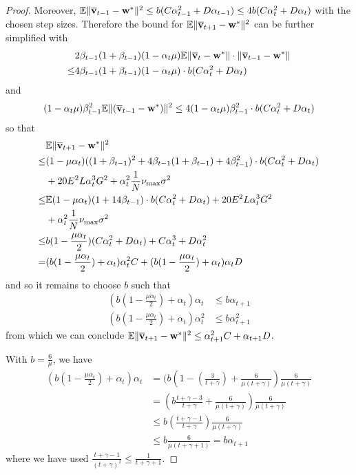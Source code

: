 \begin{proof}
Moreover, $\mathbb{E}\|{\overline{\mathbf{v}}}_{t-1}-{\mathbf{w}}^{\ast}\|^{2}\leq b(C\alpha_{t-1}^{2}+D\alpha_{t-1})\leq 4b(C\alpha_{t}^{2}+D\alpha_{t})$
with the chosen step sizes.
Therefore the bound for $\mathbb{E}\|{\overline{\mathbf{v}}}_{t+1}-{\mathbf{w}}^{\ast}\|^{2}$
can be further simplified with 
\begin{align*}
&2\beta_{t-1}(1+\beta_{t-1})(1-\alpha_{t}\mu)\mathbb{E}\|{\overline{\mathbf{v}}}_{t}-{\mathbf{w}}^{\ast}\|\cdot\|{\overline{\mathbf{v}}}_{t-1}-{\mathbf{w}}^{\ast}\| \\
\leq & 4\beta_{t-1}(1+\beta_{t-1})(1-\alpha_{t}\mu)\cdot b(C\alpha_{t}^{2}+D\alpha_{t})
\end{align*}
and 
\begin{align*}
(1-\alpha_{t}\mu)\beta_{t-1}^{2}\mathbb{E}\|({\overline{\mathbf{v}}}_{t-1}-{\mathbf{w}}^{\ast})\|^{2} 
\leq 4(1-\alpha_{t}\mu)\beta_{t-1}^{2}\cdot b(C\alpha_{t}^{2}+D\alpha_{t})
\end{align*}
so that
\begin{align*}
&\mathbb{E}\|{\overline{\mathbf{v}}}_{t+1}-{\mathbf{w}}^{\ast}\|^{2} \\
 \leq&(1-\mu\alpha_{t})((1+\beta_{t-1})^{2}+4\beta_{t-1}(1+\beta_{t-1})+4\beta_{t-1}^{2})\cdot b(C\alpha_{t}^{2}+D\alpha_{t})\\
& +20E^{2}L\alpha_{t}^{3}G^{2}+\alpha_{t}^{2}\frac{1}{N}\nu_{\max}\sigma^{2}\\
\leq &\mathbb{E}(1-\mu\alpha_{t})(1+14\beta_{t-1})\cdot b(C\alpha_{t}^{2}+D\alpha_{t})+20E^{2}L\alpha_{t}^{3}G^{2}\\
&+\alpha_{t}^{2}\frac{1}{N}\nu_{\max}\sigma^{2}\\
\leq & b(1-\frac{\mu\alpha_{t}}{2})(C\alpha_{t}^{2}+D\alpha_{t})+C\alpha_{t}^{3}+D\alpha_{t}^{2}\\
= &(b(1-\frac{\mu\alpha_{t}}{2})+\alpha_{t})\alpha_{t}^{2}C+(b(1-\frac{\mu\alpha_{t}}{2})+\alpha_{t})\alpha_{t}D
\end{align*}
and so it remains to choose $b$ such that 
\begin{align*}
(b(1-\frac{\mu\alpha_{t}}{2})+\alpha_{t})\alpha_{t} & \leq b\alpha_{t+1}\\
(b(1-\frac{\mu\alpha_{t}}{2})+\alpha_{t})\alpha_{t}^{2} & \leq b\alpha_{t+1}^{2}
\end{align*}
from which we can conclude $\mathbb{E}\|{\overline{\mathbf{v}}}_{t+1}-{\mathbf{w}}^{\ast}\|^{2}\leq\alpha_{t+1}^{2}C+\alpha_{t+1}D$.

With $b=\frac{6}{\mu}$, we have
\begin{align*}
(b(1-\frac{\mu\alpha_{t}}{2})+\alpha_{t})\alpha_{t} & =(b(1-(\frac{3}{t+\gamma})+\frac{6}{\mu(t+\gamma)})\frac{6}{\mu(t+\gamma)}\\
& =(b\frac{t+\gamma-3}{t+\gamma}+\frac{6}{\mu(t+\gamma)})\frac{6}{\mu(t+\gamma)}\\
& \leq b(\frac{t+\gamma-1}{t+\gamma})\frac{6}{\mu(t+\gamma)}\\
& \leq b\frac{6}{\mu(t+\gamma+1)}=b\alpha_{t+1}
\end{align*}
where we have used $\frac{t+\gamma-1}{(t+\gamma)^{2}}\leq\frac{1}{t+\gamma+1}$.


\end{proof}
